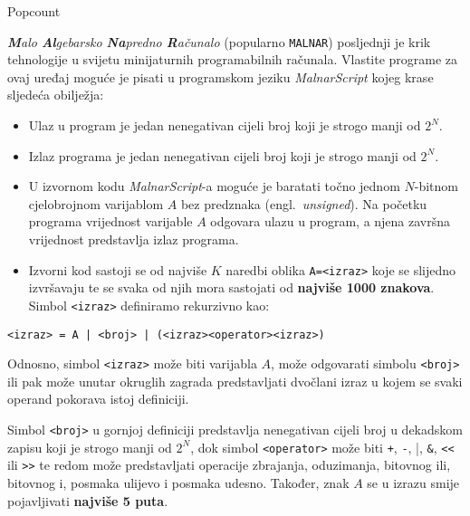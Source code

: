 \begin{statement}[
  problempoints=110,
  timelimit=1 sekunda,
  memorylimit=512 MiB,
]{Popcount}

\textit{\textbf{M}alo \textbf{Al}gebarsko \textbf{Na}predno \textbf{R}ačunalo}
(popularno \texttt{MALNAR}) posljednji je krik tehnologije u svijetu
minijaturnih programabilnih računala. Vlastite programe za ovaj uređaj moguće
je pisati u programskom jeziku \textit{MalnarScript} kojeg krase sljedeća
obilježja:

\begin{itemize}[topsep=0pt]
   \item Ulaz u program je jedan nenegativan cijeli broj koji je strogo manji
         od $2^N$.
   \item Izlaz programa je jedan nenegativan cijeli broj koji je strogo manji
         od $2^N$.
   \item U izvornom kodu \textit{MalnarScript}-a moguće je baratati točno
         jednom $N$-bitnom cjelobrojnom  varijablom $A$ bez predznaka (engl.\
         \textit{unsigned}). Na početku programa vrijednost varijable $A$
         odgovara ulazu u program, a njena završna vrijednost predstavlja izlaz
         programa.
   \item Izvorni kod sastoji se od najviše $K$ naredbi oblika \texttt{A=<izraz>}
         koje se slijedno izvršavaju te se svaka od njih mora sastojati od
         \textbf{najviše 1000 znakova}. Simbol \texttt{<izraz>} definiramo
         rekurzivno kao:
\end{itemize}

\begin{center}
  \texttt{<izraz> = A | <broj> | (<izraz><operator><izraz>)}
\end{center}

Odnosno, simbol \texttt{<izraz>} može biti varijabla $A$, može odgovarati
simbolu \texttt{<broj>} ili pak može unutar okruglih zagrada predstavljati
dvočlani izraz u kojem se svaki operand pokorava istoj definiciji.

Simbol \texttt{<broj>} u gornjoj definiciji predstavlja nenegativan cijeli broj
u dekadskom zapisu koji je strogo manji od $2^N$, dok simbol
\verb|<operator>| može biti \verb|+|, \verb|-|, \verb|||,
\verb|&|, \verb|<<| ili \verb|>>| te redom može predstavljati
operacije zbrajanja, oduzimanja, bitovnog ili, bitovnog i, posmaka ulijevo i
posmaka udesno.  Također, znak $A$ se u izrazu smije pojavljivati
\textbf{najviše 5 puta}.


\end{statement}

